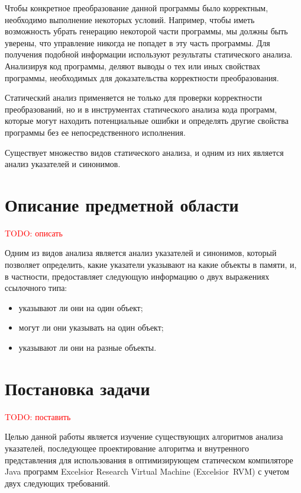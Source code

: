 \documentclass[a4,14pt,titlepage]{extarticle}
\newcommand{\todo}[1]{\textcolor{red}{TODO: #1}}
\newcommand{\eng}[1]{{\English#1}}
\begin{document}
    Чтобы конкретное преобразование данной программы было корректным,
    необходимо выполнение некоторых условий. Например, чтобы иметь
    возможность убрать генерацию некоторой части программы, мы должны быть
    уверены, что управление никогда не попадет в эту часть программы.
    Для получения подобной информации используют результаты статического
    анализа. Анализируя код программы, деляют выводы о тех или иных свойствах
    программы, необходимых для доказательства корректности преобразования.

    Статический анализ применяется не только для проверки
    корректности преобразований, но и в инструментах статического анализа
    кода программ, которые могут находить потенциальные ошибки и определять
    другие свойства программы без ее непосредственного исполнения.

    Существует множество видов статического анализа, и одним из них
    является анализ указателей и синонимов.

  \newpage
  \section{Описание предметной области}
    \todo{описать}

    Одним из видов анализа является анализ указателей и синонимов, который
    позволяет определить, какие указатели указывают на какие объекты в памяти,
    и, в частности, предоставляет следующую информацию о двух выражениях
    ссылочного типа:
    \begin{itemize}
      \item указывают ли они на один объект;
      \item могут ли они указывать на один объект;
      \item указывают ли они на разные объекты.
    \end{itemize}


  \newpage
  \section{Постановка задачи}
    \todo{поставить}

    Целью данной работы является изучение существующих алгоритмов анализа
    указателей, последующее проектирование алгоритма и
    внутренного представления для использования в оптимизирующем
    статическом компиляторе Java программ
    \eng{Excelsior Research Virtual Machine (Excelsior~RVM)}
    с учетом двух следующих требований.
\end{document}
